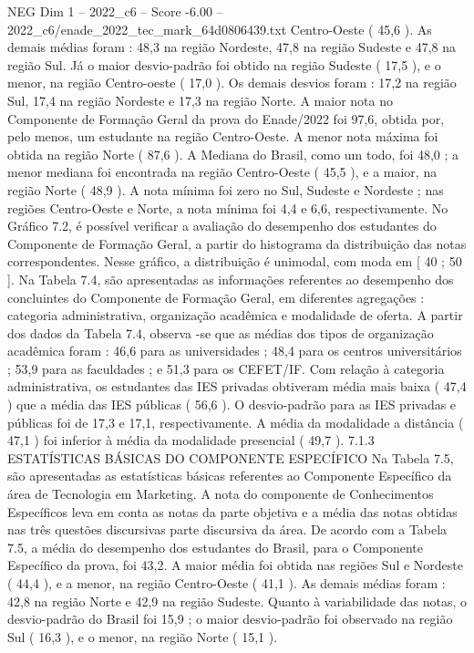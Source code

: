 \begin{textsample}{NEG Dim 1 – 2022\_c6 – Score -6.00 – 2022\_c6/enade\_2022\_tec\_mark\_64d0806439.txt}
Centro-Oeste ( 45,6 ).
As demais médias foram : 48,3 na região Nordeste, 47,8 na região Sudeste e 47,8 na região Sul.
Já o maior desvio-padrão foi obtido na região Sudeste ( 17,5 ), e o menor, na região Centro-oeste ( 17,0 ).
Os demais desvios foram : 17,2 na região Sul, 17,4 na região Nordeste e 17,3 na região Norte.
A maior nota no Componente de Formação Geral da prova do Enade/2022 foi 97,6, obtida por, pelo menos, um estudante na região Centro-Oeste.
A menor nota máxima foi obtida na região Norte ( 87,6 ).
A Mediana do Brasil, como um todo, foi 48,0 ; a menor mediana foi encontrada na região Centro-Oeste ( 45,5 ), e a maior, na região Norte ( 48,9 ).
A nota mínima foi zero no Sul, Sudeste e Nordeste ; nas regiões Centro-Oeste e Norte, a nota mínima foi 4,4 e 6,6, respectivamente.
No Gráfico 7.2, é possível verificar a avaliação do desempenho dos estudantes do Componente de Formação Geral, a partir do histograma da distribuição das notas correspondentes.
Nesse gráfico, a distribuição é unimodal, com moda em [ 40 ; 50 ].
Na Tabela 7.4, são apresentadas as informações referentes ao desempenho dos concluintes do Componente de Formação Geral, em diferentes agregações : categoria administrativa, organização acadêmica e modalidade de oferta.
A partir dos dados da Tabela 7.4, observa -se que as médias dos tipos de organização acadêmica foram : 46,6 para as universidades ; 48,4 para os centros universitários ; 53,9 para as faculdades ; e 51,3 para os CEFET/IF.
Com relação à categoria administrativa, os estudantes das IES privadas obtiveram média mais baixa ( 47,4 ) que a média das IES públicas ( 56,6 ).
O desvio-padrão para as IES privadas e públicas foi de 17,3 e 17,1, respectivamente.
A média da modalidade a distância ( 47,1 ) foi inferior à média da modalidade presencial ( 49,7 ). 7.1.3 ESTATÍSTICAS BÁSICAS DO COMPONENTE ESPECÍFICO Na Tabela 7.5, são apresentadas as estatísticas básicas referentes ao Componente Específico da área de Tecnologia em Marketing.
A nota do componente de Conhecimentos Específicos leva em conta as notas da parte objetiva e a média das notas obtidas nas três questões discursivas parte discursiva da área.
De acordo com a Tabela 7.5, a média do desempenho dos estudantes do Brasil, para o Componente Específico da prova, foi 43,2.
A maior média foi obtida nas regiões Sul e Nordeste ( 44,4 ), e a menor, na região Centro-Oeste ( 41,1 ).
As demais médias foram : 42,8 na região Norte e 42,9 na região Sudeste.
Quanto à variabilidade das notas, o desvio-padrão do Brasil foi 15,9 ; o maior desvio-padrão foi observado na região Sul ( 16,3 ), e o menor, na região Norte ( 15,1 ).

\end{textsample}
